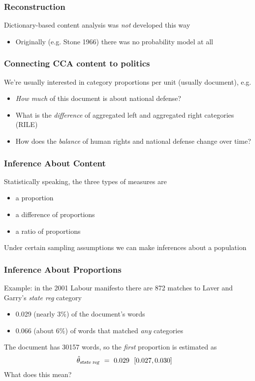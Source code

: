 \documentclass[11pt,compress,professionalfonts]{beamer}
\newcommand{\ita}{\begin{itemize}}
\newcommand{\itm}{\item[]}
\newcommand{\itz}{\end{itemize}}
\begin{document}
\begin{frame}[t]\frametitle{Reconstruction}

Dictionary-based content analysis was \textit{not} developed this way
\ita
\itm Originally (e.g. Stone 1966) there was no probability model at all
\itz



\end{frame}
\begin{frame}[t]\frametitle{Connecting CCA content to politics}

We're usually interested in category proportions per unit (usually document), e.g.
\ita
\itm \textsl{How much} of this document is about national defense?
\itm What is the \textsl{difference} of aggregated left and aggregated right categories (RILE)
\itm How does the \textsl{balance} of human rights and national defense change over time?
\itz


\end{frame}
\begin{frame}[t]\frametitle{Inference About Content}

Statistically speaking, the three types of measures are
\ita
\itm a proportion
\itm a difference of proportions
\itm a ratio of proportions
\itz
Under certain sampling assumptions we can make inferences about a population

%

\end{frame}
\begin{frame}[t]\frametitle{Inference About Proportions}

Example: in the 2001 Labour manifesto there are 872 matches to Laver and Garry's \textsl{state reg} category
\ita
\itm 0.029 (nearly 3\%) of the document's words
\itm 0.066 (about 6\%) of words that matched \textsl{any} categories
\itz
The document has 30157 words, so the \textsl{first} proportion is estimated as
\begin{align*}
\hat{\theta}_\text{\textsl{state reg}} & ~=~ 0.029 ~~[0.027, 0.030]
\end{align*}
What does this mean?

\end{frame}
\end{document}
